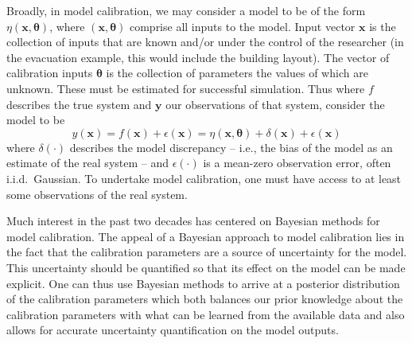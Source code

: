 \documentclass{article}
\begin{document}
Broadly, in model calibration, we may consider a model to be of the form $\eta(\mathbf x,\boldsymbol \theta)$, where $(\mathbf x,\boldsymbol \theta)$ comprise all inputs to the model. Input vector $\mathbf x$ is the collection of inputs that are known and/or under the control of the researcher (in the evacuation example, this would include the building layout).  The vector of calibration inputs $\boldsymbol \theta$ is the collection of parameters the values of which are unknown. These must be estimated for successful simulation. Thus where $f$ describes the true system and $\mathbf y$ our observations of that system, consider the model to be 
\begin{equation} \label{eq:model_gen}
y(\mathbf x)=f(\mathbf x)+\epsilon(\mathbf x)=\eta(\mathbf x,\boldsymbol \theta) + \delta(\mathbf x)+\epsilon(\mathbf x)
\end{equation} 
where $\delta(\cdot)$ describes the model discrepancy -- i.e., the bias of the model as an estimate of the real system -- and $\epsilon(\cdot)$ is a mean-zero observation error, often i.i.d.\ Gaussian. %
To undertake model calibration, one must have access to at least some observations of the real system.%

Much interest in the past two decades has centered on Bayesian methods for model calibration. The appeal of a Bayesian approach to model calibration lies in the fact that the calibration parameters are a source of uncertainty for the model. This uncertainty should be quantified so that its effect on the model can be made explicit. One can thus use Bayesian methods to arrive at a posterior distribution of the calibration parameters which both balances our prior knowledge about the calibration parameters with what can be learned from the available data and also allows for accurate uncertainty quantification on the model outputs. 
\end{document}

